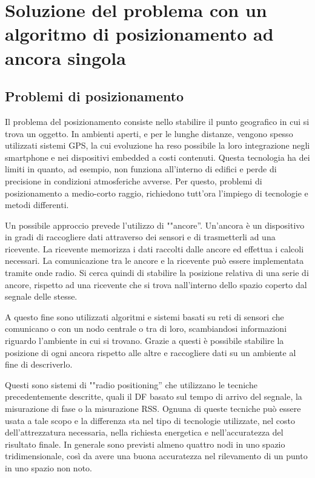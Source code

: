 \chapter{Soluzione del problema con un algoritmo di posizionamento ad ancora singola}
\section{Problemi di posizionamento}
Il problema del posizionamento consiste nello stabilire il punto geografico in cui si trova un oggetto. In ambienti aperti, e per le lunghe distanze, vengono spesso utilizzati sistemi GPS, la cui evoluzione ha reso possibile la loro integrazione negli smartphone e nei dispositivi embedded a costi contenuti. Questa tecnologia ha dei limiti in quanto, ad esempio, non funziona all'interno di edifici e perde di precisione in condizioni atmosferiche avverse. Per questo, problemi di posizionamento a medio-corto raggio, richiedono tutt'ora l'impiego di tecnologie  e metodi differenti. 

Un possibile approccio prevede l'utilizzo di ""ancore''. Un'ancora è un dispositivo in gradi di raccogliere dati attraverso dei sensori e di trasmetterli ad una ricevente. La ricevente memorizza i dati raccolti dalle ancore ed effettua i calcoli necessari. La comunicazione tra le ancore e la ricevente può essere implementata tramite onde radio. Si cerca quindi di stabilire la posizione relativa di una serie di ancore, rispetto ad una ricevente che si trova nall'interno dello spazio coperto dal segnale delle stesse.

A questo fine sono utilizzati algoritmi e sistemi basati su reti di sensori che comunicano o con un nodo centrale o tra di loro, scambiandosi informazioni riguardo l'ambiente in cui si trovano. Grazie a questi è possibile stabilire la posizione di ogni ancora rispetto alle altre e raccogliere dati su un ambiente al fine di descriverlo. 

Questi sono sistemi di ""radio positioning'' che utilizzano le tecniche precedentemente descritte, quali il DF basato sul tempo di arrivo del segnale, la misurazione di fase o la misurazione RSS. Ognuna di queste tecniche può essere usata a tale scopo e la differenza sta nel tipo di tecnologie utilizzate, nel costo dell'attrezzatura necessaria, nella richiesta energetica e nell'accuratezza del risultato finale.
In generale sono previsti almeno quattro nodi in uno spazio tridimensionale, così da avere una buona accuratezza nel rilevamento di un punto in uno spazio non noto. 


